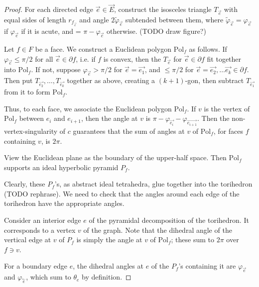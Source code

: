 \documentclass[11pt]{amsart}
\newcommand{\cev}[1]{\overset{\leftarrow}{#1}}
\newcommand{\del}{\partial}
\newcommand{\vphi}{\varphi}
\newcommand{\Pol}{{\text{Pol}}}
\theoremstyle{plain}
\theoremstyle{definition}
\begin{document}
\begin{proof}
For each directed edge $\vec{e} \in \vec{E}$,
construct the isosceles triangle $T_{\vec{e}}$
with equal sides of length $r_{f_{\vec{e}}}$ and
angle $2\tilde{\vphi}_{\vec{e}}$ subtended between them,
where $\tilde{\vphi}_{\vec{e}} = \vphi_{\vec{e}}$
if $\vphi_{\vec{e}}$ if it is acute,
and = $\pi - \vphi_{\vec{e}}$ otherwise.
(TODO draw figure?)


Let $f \in F$ be a face.
We construct a Euclidean polygon $\Pol_f$ as follows.
If $\vphi_{\vec{e}} \leq \pi/2$ for all $\vec{e} \in \del f$,
i.e. if $f$ is convex, then 
the $T_{\vec{e}}$ for $\vec{e}\in \del f$
fit together into $\Pol_f$.
If not, suppose $\vphi_{\vec{e}} > \pi/2$
for $\vec{e} = \vec{e_1}$, 
and $\leq \pi/2$ for $\vec{e} = \vec{e_2},\ldots \vec{e_k} \in \del f$.
Then put $T_{\vec{e_2}},\ldots,T_{\vec{e_k}}$ together as above,
creating a $(k+1)$-gon,
then subtract $T_{\vec{e_1}}$ from it to form $\Pol_f$.

Thus, to each face, we associate the Euclidean polygon $\Pol_f$.
If $v$ is the vertex of $\Pol_f$ between $e_i$ and $e_{i+1}$,
then the angle at $v$ is
$\pi - \vphi_{\vec{e_i}} - \vphi_{\vec{e_{i+1}}}$.
Then the non-vertex-singularity of $c$ guarantees that
the sum of angles at $v$ of $\Pol_f$, for faces $f$ containing $v$,
is $2\pi$.


View the Euclidean plane as the boundary of the upper-half space.
Then $\Pol_f$ supports an ideal hyperbolic pyramid $P_f$.

Clearly, these $P_f$'s, as abstract ideal tetrahedra,
glue together into the torihedron (TODO rephrase).
We need to check that the angles around each edge of
the torihedron have the appropriate angles.


Consider an interior edge $e$ of the pyramidal decomposition
of the torihedron.
It corresponds to a vertex $v$ of the graph.
Note that the dihedral angle of the vertical edge
at $v$ of $P_f$ is simply the angle at $v$ of $\Pol_f$;
these sum to $2\pi$ over $f \ni v$.


For a boundary edge $e$, the dihedral angles at $e$ of the $P_f$'s
containing it are $\vphi_{\vec{e}}$ and $\vphi_{\cev{e}}$,
which sum to $\theta_e$ by definition.

\end{proof}
\end{document}
